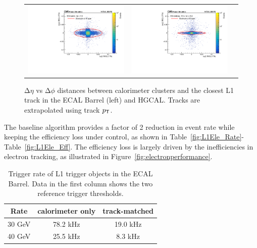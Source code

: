  \begin{figure}[tbh!]
 \begin{center}
  \begin{tabular}{ccc}
   \includegraphics[width=.45\linewidth]{figures/Part2/Upgrade/DR_barrel}&
   \includegraphics[width=.45\linewidth]{figures/Part2/Upgrade/DR_endcap}&
  \end{tabular}
  \caption{$\mathrm{\Delta}\eta$ vs $\mathrm{\Delta}\phi$ distances between calorimeter clusters and the closest \ac{L1} track in the \ac{ECAL} Barrel (left) and \ac{HGCAL}. Tracks are extrapolated using track $p_{\textsf{T}}$.}
 \label{fig:electron}
 \end{center}
\end{figure}

The baseline algorithm provides a factor of 2 reduction in event rate while keeping the efficiency loss under control, as shown in Table~\ref{fig:L1Ele_Rate}-Table~\ref{fig:L1Ele_Eff}. The efficiency loss is largely driven by the inefficiencies in electron tracking, as illustrated in Figure~\ref{fig:electronperformance}.

\begin{table}[th]
\sffamily
\centering
\caption{Trigger rate of \ac{L1} trigger objects in the \ac{ECAL} Barrel. Data in the first column shows the two reference trigger thresholds.}
\begin{tabular}{ccc} \toprule
Rate & calorimeter only & track-matched \\    \midrule
 30 GeV     & 78.2 kHz      & 19.0 kHz\\ \midrule
 40 GeV &  25.5 kHz     & 8.3 kHz\\ \bottomrule
\end{tabular}
\label{tab:L1Ele_Rate}
\end{table}

